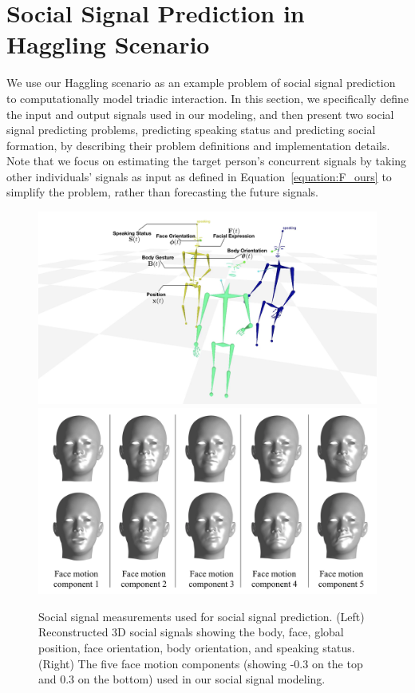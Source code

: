 
\section{Social Signal Prediction in Haggling Scenario}
We use our Haggling scenario as an example problem of social signal prediction to computationally model triadic interaction. In this section, we specifically define the input and output signals used in our modeling, and then present two social signal predicting problems, predicting speaking status and predicting social formation, by describing their problem definitions and implementation details. Note that we focus on estimating the target person's concurrent signals by taking other individuals' signals as input as defined in Equation~\ref{equation:F_ours} to simplify the problem, rather than forecasting the future signals.


\begin{figure}[t]
	\includegraphics[trim=250 0 250 0,clip,height=0.3\linewidth]{ssp_fig/ssp_notation_input}
	\includegraphics[trim=10 10 10 10,clip,height=0.3\linewidth]{ssp_fig/facemotion_comp}
	\caption{Social signal measurements used for social signal prediction. (Left) Reconstructed 3D social signals showing the body, face,  global position, face orientation, body orientation, and speaking status. (Right) The five face motion components (showing -0.3 on the top and 0.3 on the bottom) used in our social signal modeling.}
	\label{fig:notation_input}
\end{figure}


